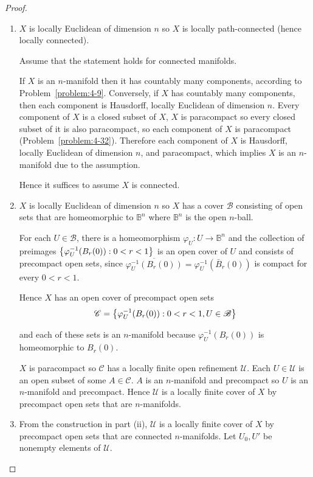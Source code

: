 \begin{proof}
	\begin{enumerate}[label={(\alph*)}]
		\item $X$ is locally Euclidean of dimension $n$ so $X$ is locally path-connected (hence locally connected).

		      Assume that the statement holds for connected manifolds.

		      If $X$ is an $n$-manifold then it has countably many components, according to Problem~\ref{problem:4-9}. Conversely, if $X$ has countably many components, then each component is Hausdorff, locally Euclidean of dimension $n$. Every component of $X$ is a closed subset of $X$, $X$ is paracompact so every closed subset of it is also paracompact, so each component of $X$ is paracompact (Problem~\ref{problem:4-32}). Therefore each component of $X$ is Hausdorff, locally Euclidean of dimension $n$, and paracompact, which implies $X$ is an $n$-manifold due to the assumption.

		      Hence it suffices to assume $X$ is connected.
		\item $X$ is locally Euclidean of dimension $n$ so $X$ has a cover $\mathscr{B}$ consisting of open sets that are homeomorphic to $\mathbb{B}^{n}$ where $\mathbb{B}^{n}$ is the open $n$-ball.

		      For each $U\in \mathscr{B}$, there is a homeomorphism $\varphi_{U}: U \to \mathbb{B}^{n}$ and the collection of preimages $\left\{{ \varphi_{U}^{-1}(B_{r}(0)) : 0 < r < 1 }\right\}$ is an open cover of $U$ and consists of precompact open sets, since $\overline{\varphi_{U}^{-1}(B_{r}(0))} = \varphi_{U}^{-1}(\bar{B}_{r}(0))$ is compact for every $0 < r < 1$.

		      Hence $X$ has an open cover of precompact open sets
		      \begin{align*}
			      \mathscr{C} = \left\{{ \varphi_{U}^{-1}(B_{r}(0)) : 0 < r < 1, U\in \mathscr{B} }\right\}
		      \end{align*}

		      and each of these sets is an $n$-manifold because $\varphi_{U}^{-1}(B_{r}(0))$ is homeomorphic to $B_{r}(0)$.

		      $X$ is paracompact so $\mathscr{C}$ has a locally finite open refinement $\mathscr{U}$. Each $U\in\mathscr{U}$ is an open subset of some $A\in \mathscr{C}$. $A$ is an $n$-manifold and precompact so $U$ is an $n$-manifold and precompact. Hence $\mathscr{U}$ is a locally finite cover of $X$ by precompact open sets that are $n$-manifolds.
		\item From the construction in part (ii), $\mathscr{U}$ is a locally finite cover of $X$ by precompact open sets that are connected $n$-manifolds. Let $U_{0}, U'$ be nonempty elements of $\mathscr{U}$.


\end{enumerate}
\end{proof}
